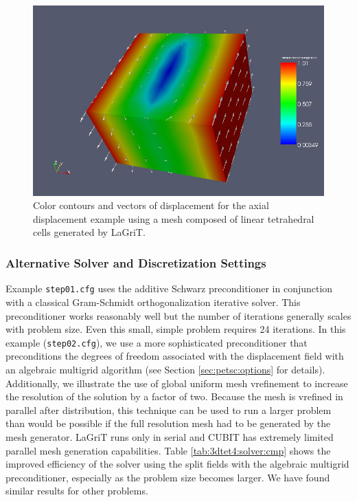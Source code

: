 \begin{center}
\begin{figure}
\begin{centering}
\includegraphics[scale=0.45]{tutorials/3dtet4/figs/shear}
\par\end{centering}

\caption{Color contours and vectors of displacement for the axial displacement
example using a mesh composed of linear tetrahedral cells generated
by LaGriT.\label{fig:3dtet4-shear}}
\end{figure}

\par\end{center}


\subsubsection{Alternative Solver and Discretization Settings}

Example \texttt{step01.cfg} uses the additive Schwarz preconditioner
in conjunction with a classical Gram-Schmidt orthogonalization iterative
solver. This preconditioner works reasonably well but the number of
iterations generally scales with problem size. Even this small, simple
problem requires 24 iterations. In this example (\texttt{step02.cfg}),
we use a more sophisticated preconditioner that preconditions the
degrees of freedom associated with the displacement field with an
algebraic multigrid algorithm (see Section \vref{sec:petsc:options}
for details). Additionally, we illustrate the use of global uniform
mesh vrefinement to increase the resolution of the solution by a factor
of two. Because the mesh is vrefined in parallel after distribution,
this technique can be used to run a larger problem than would be possible
if the full resolution mesh had to be generated by the mesh generator.
LaGriT runs only in serial and CUBIT has extremely limited parallel
mesh generation capabilities. Table \vref{tab:3dtet4:solver:cmp} shows
the improved efficiency of the solver using the split fields with
the algebraic multigrid preconditioner, especially as the problem
size becomes larger. We have found similar results for other problems.

